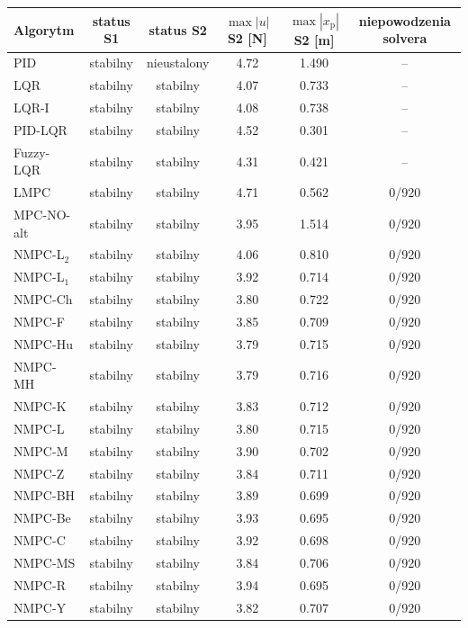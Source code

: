 \begin{tabular}{lccccc}
\hline
Algorytm & status S1 & status S2 & $\max|u|$ S2 [N] & $\max|x_\mathrm{p}|$ S2 [m] & niepowodzenia solvera \\
\hline
PID & stabilny & nieustalony & 4.72 & 1.490 & -- \\
LQR & stabilny & stabilny & 4.07 & 0.733 & -- \\
LQR-I & stabilny & stabilny & 4.08 & 0.738 & -- \\
PID-LQR & stabilny & stabilny & 4.52 & 0.301 & -- \\
Fuzzy-LQR & stabilny & stabilny & 4.31 & 0.421 & -- \\
LMPC & stabilny & stabilny & 4.71 & 0.562 & 0/920 \\
MPC-NO-alt & stabilny & stabilny & 3.95 & 1.514 & 0/920 \\
NMPC-L$_2$ & stabilny & stabilny & 4.06 & 0.810 & 0/920 \\
NMPC-L$_1$ & stabilny & stabilny & 3.92 & 0.714 & 0/920 \\
NMPC-Ch & stabilny & stabilny & 3.80 & 0.722 & 0/920 \\
NMPC-F & stabilny & stabilny & 3.85 & 0.709 & 0/920 \\
NMPC-Hu & stabilny & stabilny & 3.79 & 0.715 & 0/920 \\
NMPC-MH & stabilny & stabilny & 3.79 & 0.716 & 0/920 \\
NMPC-K & stabilny & stabilny & 3.83 & 0.712 & 0/920 \\
NMPC-L & stabilny & stabilny & 3.80 & 0.715 & 0/920 \\
NMPC-M & stabilny & stabilny & 3.90 & 0.702 & 0/920 \\
NMPC-Z & stabilny & stabilny & 3.84 & 0.711 & 0/920 \\
NMPC-BH & stabilny & stabilny & 3.89 & 0.699 & 0/920 \\
NMPC-Be & stabilny & stabilny & 3.93 & 0.695 & 0/920 \\
NMPC-C & stabilny & stabilny & 3.92 & 0.698 & 0/920 \\
NMPC-MS & stabilny & stabilny & 3.84 & 0.706 & 0/920 \\
NMPC-R & stabilny & stabilny & 3.94 & 0.695 & 0/920 \\
NMPC-Y & stabilny & stabilny & 3.82 & 0.707 & 0/920 \\
\hline
\end{tabular}
